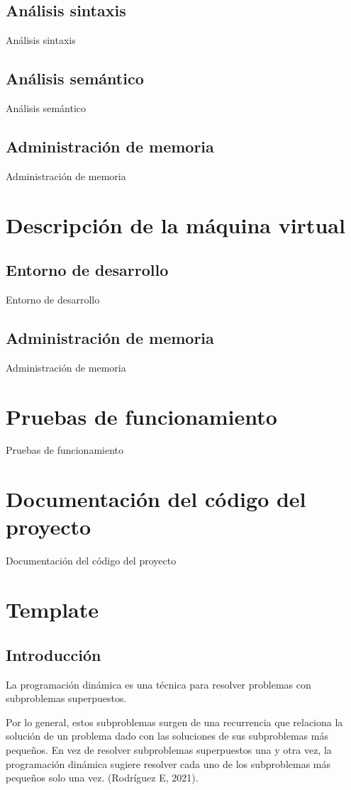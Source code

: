 \documentclass[12pt,letterpaper, titlepage, onecolumn]{article}
\begin{document}
	\subsection{Análisis sintaxis}
	Análisis sintaxis
	\subsection{Análisis semántico}
	Análisis semántico
	\subsection{Administración de memoria}
	Administración de memoria

\section{Descripción de la máquina virtual}
	\subsection{Entorno de desarrollo}
	Entorno de desarrollo
	\subsection{Administración de memoria}
	Administración de memoria
	
\section{Pruebas de funcionamiento}
Pruebas de funcionamiento

\section{Documentación del código del proyecto}
Documentación del código del proyecto



\section{Template}
\appendix
\subsection{Introducción}		
La programación dinámica es una técnica para resolver problemas con subproblemas 
superpuestos.\\
\par\indent Por lo general, estos subproblemas surgen de una recurrencia que relaciona la 
solución de un problema dado con las soluciones de sus subproblemas más pequeños.
En vez de resolver subproblemas superpuestos una y otra vez, la programación 
dinámica sugiere resolver cada uno de los subproblemas más pequeños solo una vez. (Rodríguez E, 2021).
	
\end{document}
